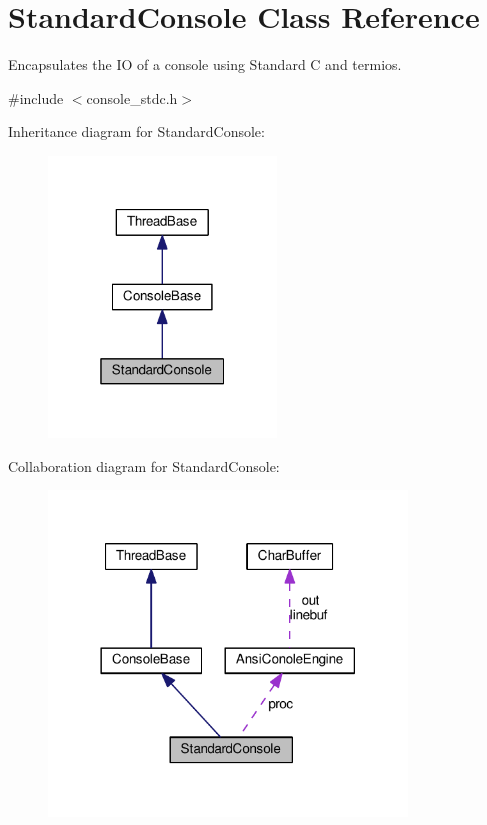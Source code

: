 \hypertarget{classStandardConsole}{}\section{Standard\+Console Class Reference}
\label{classStandardConsole}


Encapsulates the IO of a console using Standard C and termios.  




{\ttfamily \#include $<$console\+\_\+stdc.\+h$>$}



Inheritance diagram for Standard\+Console\+:
\nopagebreak
\begin{figure}[H]
\begin{center}
\leavevmode
\includegraphics[width=172pt]{d5/d99/classStandardConsole__inherit__graph}
\end{center}
\end{figure}


Collaboration diagram for Standard\+Console\+:
\nopagebreak
\begin{figure}[H]
\begin{center}
\leavevmode
\includegraphics[width=270pt]{d2/d3d/classStandardConsole__coll__graph}
\end{center}
\end{figure}
